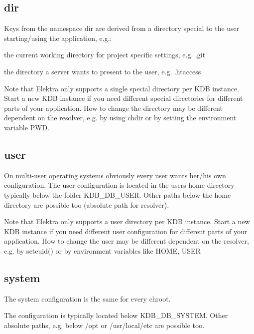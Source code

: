 \subsection*{dir}

Keys from the namespace {\ttfamily dir} are derived from a directory special to the user starting/using the application, e.\+g.\+:


\begin{DoxyItemize}
\item the current working directory for project specific settings, e.\+g. {\ttfamily .git}
\item the directory a server wants to present to the user, e.\+g. {\ttfamily .htaccess}
\end{DoxyItemize}

Note that Elektra only supports a single special directory per K\+DB instance. Start a new K\+DB instance if you need different special directories for different parts of your application. How to change the directory may be different dependent on the resolver, e.\+g. by using chdir or by setting the environment variable {\ttfamily P\+WD}.

\subsection*{user}

On multi-\/user operating systems obviously every user wants her/his own configuration. The user configuration is located in the users home directory typically below the folder {\ttfamily K\+D\+B\+\_\+\+D\+B\+\_\+\+U\+S\+ER.} Other paths below the home directory are possible too (absolute path for resolver).

Note that Elektra only supports a user directory per K\+DB instance. Start a new K\+DB instance if you need different user configuration for different parts of your application. How to change the user may be different dependent on the resolver, e.\+g. by {\ttfamily seteuid()} or by environment variables like {\ttfamily H\+O\+ME}, {\ttfamily U\+S\+ER}

\subsection*{system}

The system configuration is the same for every chroot.

The configuration is typically located below {\ttfamily K\+D\+B\+\_\+\+D\+B\+\_\+\+S\+Y\+S\+T\+EM}. Other absolute paths, e.\+g. below {\ttfamily /opt} or {\ttfamily /usr/local/etc} are possible too.

